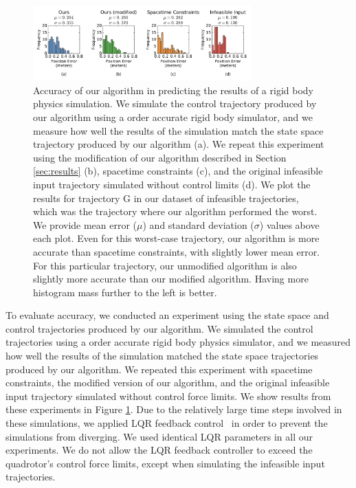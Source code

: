 \begin{figure}[t!]
\centering
\includegraphics[width=3.3in]{images/2016_siggraph/02_accuracy.pdf}
\caption{
Accuracy of our algorithm in predicting the results of a rigid body physics simulation.
We simulate the control trajectory produced by our algorithm using a  order accurate rigid body simulator, and we measure how well the results of the simulation match the state space trajectory produced by our algorithm (a).
We repeat this experiment using the modification of our algorithm described in Section \ref{sec:results} (b), spacetime constraints (c), and the original infeasible input trajectory simulated without control limits (d).
We plot the results for trajectory \textsc{G} in our dataset of infeasible trajectories, which was the trajectory where our algorithm performed the worst.
We provide mean error ($\mu$) and standard deviation ($\sigma$) values above each plot.
Even for this worst-case trajectory, our algorithm is more accurate than spacetime constraints, with slightly lower mean error.
For this particular trajectory, our unmodified algorithm is also slightly more accurate than our modified algorithm.
Having more histogram mass further to the left is better.
}
\label{fig:accuracy}
\end{figure}

To evaluate accuracy, we conducted an experiment using the state space and control trajectories produced by our algorithm.
We simulated the control trajectories using a  order accurate rigid body physics simulator, and we measured how well the results of the simulation matched the state space trajectories produced by our algorithm.
We repeated this experiment with spacetime constraints, the modified version of our algorithm, and the original infeasible input trajectory simulated without control force limits.
We show results from these experiments in Figure \ref{fig:accuracy}.
Due to the relatively large time steps involved in these simulations, we applied LQR feedback control~\cite{tedrake:2016} in order to prevent the simulations from diverging.
We used identical LQR parameters in all our experiments.
We do not allow the LQR feedback controller to exceed the quadrotor's control force limits, except when simulating the infeasible input trajectories.

